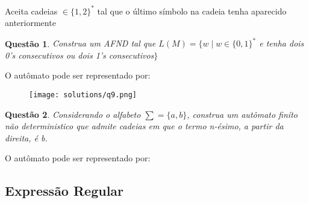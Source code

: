 \documentclass{article}
\newtheorem{problem}{Questão}
\begin{document}
    \begin{solution}
        Aceita cadeias $\in \{1,2\}^*$ tal que o último símbolo na cadeia tenha aparecido anteriormente
    \end{solution}
    
     \begin{problem}
        Construa um AFND tal que $L(M) = \{ w \mid w \in \{0,1\}^*
        $ e tenha dois 0’s
        consecutivos ou dois 1’s consecutivos$\}$
    \end{problem}
    
    \begin{solution} O autômato pode ser representado por:
          \begin{figure}[H]
                \centering
                \texttt{[image: solutions/q9.png]}
            \end{figure}
    \end{solution}
    
    \begin{problem}
        Considerando o alfabeto $\sum = \{ a, b\}$, construa um autômato finíto não deterministico que admite cadeias em que o termo n-ésimo, a partir da direita, é b.
    \end{problem}
    
    \begin{solution} O autômato pode ser representado por:
          
    \end{solution}
    
    
    \subsection{Expressão Regular}
    
\end{document}
